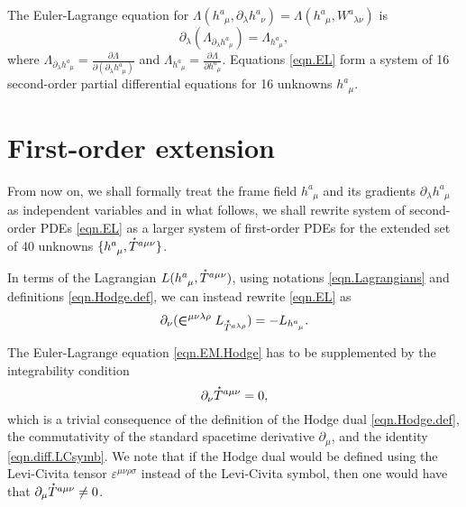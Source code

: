 \documentclass[
10pt, %
a4paper, %
oneside, %
headinclude,footinclude, %
BCOR5mm, %
]{scrartcl}
\newcommand{\IP}[1]{{\color{Red}[IP:\ \ #1]}}
\newcommand{\pd}[1]{\partial_{#1}}
\newcommand{\tetrsymbol}{h}
\newcommand{\tetr}[2]{\tetrsymbol^{#1}_{\phantom{#1}#2}}
\newcommand{\D}[1]{\partial_{#1}} %
\newcommand{\w}[2]{W^{#1}_{\phantom{#1}#2}}
\newcommand{\Lag}{\Lambda}	%
\newcommand{\Laghodge}{L}%
\newcommand{\LCsymb}{\bm{\in}}    %
\newcommand{\LCtens}{\varepsilon} %
\newcommand{\HDT}[1]{\accentset{\star}{T}^{#1}}
\begin{document}
The Euler-Lagrange equation for $ \Lag(\tetr{a}{\mu},\pd{\lambda}\tetr{a}{\nu}) = \Lag(\tetr{a}{\mu},\w{a}{\lambda\nu}) $ is
\begin{equation}\label{eqn.EL}
\pd{\lambda}(\Lag_{\pd{\lambda}\tetr{a}{\mu}}) = \Lag_{\tetr{a}{\mu}},
\end{equation}
where $ \Lag_{\pd{\lambda}\tetr{a}{\mu}} = \frac{\partial 
\Lag}{\partial(\pd{\lambda}\tetr{a}{\mu})} $ and $ 
\Lag_{\tetr{a}{\mu}} = \frac{\partial \Lag}{\partial\tetr{a}{\mu}} $. Equations \eqref{eqn.EL} 
form a system of 16 second-order partial differential equations for 16 unknowns $ \tetr{a}{\mu} $.


\section{First-order extension}\label{sec.PDEs}

From now on, we shall formally treat the frame field $ \tetr{a}{\mu} $ and its gradients $ 
\pd{\lambda}\tetr{a}{\mu} $ as independent variables and in what follows, we shall rewrite system 
of second-order PDEs \eqref{eqn.EL} as a larger system of first-order PDEs for the extended set of 
40 unknowns $ \{ \tetr{a}{\mu},\HDT{a\mu\nu}\} $.


In terms of the Lagrangian $ \Laghodge(\tetr{a}{\mu},\HDT{a\mu\nu}) $, using notations 
\eqref{eqn.Lagrangians} and definitions 
\eqref{eqn.Hodge.def}, we can instead
rewrite \eqref{eqn.EL} as
\begin{equation}\label{eqn.EM.Hodge}
\D{\nu}(\LCsymb^{\mu\nu\lambda\rho}\Laghodge_{\HDT{a\lambda\rho}}) 
=-\Laghodge_{\tetr{a}{\mu}}.
\end{equation}

The Euler-Lagrange equation \eqref{eqn.EM.Hodge} has to be supplemented by the integrability 
condition
\begin{equation}\label{integr.HT}
\D{\nu}\HDT{a\mu\nu} = 0,
\end{equation}
which is a trivial consequence of the definition of the  Hodge dual \eqref{eqn.Hodge.def}, the 
commutativity of the standard spacetime derivative $ \D{\mu} $, and the 
identity \eqref{eqn.diff.LCsymb}.
We note that if the Hodge dual would be defined using the Levi-Civita tensor $ 
\LCtens^{\mu\nu\rho\sigma} $ instead of the Levi-Civita symbol, then one would 
have that $ \D{\mu}\HDT{a\mu\nu} \neq 0 $.
\end{document}
